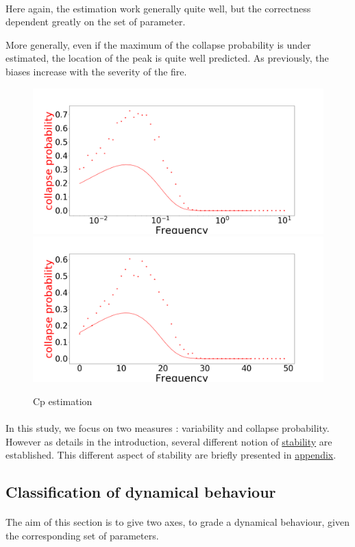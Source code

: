 \documentclass{article}
\begin{document}
\paragraph{}
Here again, the estimation work generally quite well, but the correctness dependent greatly on the set of parameter.

More generally, even if the maximum of the collapse probability is under estimated, the location of the peak is quite well predicted. As previously, the biases increase with the severity of the fire.


\begin{figure}[h!]
\centering
\includegraphics[width=6.cm]{cp_good.png}
\includegraphics[width=6.cm]{cp_bad.png}
\caption{Cp estimation}
\end{figure}



\paragraph{}
In this study, we focus on two measures : variability and collapse probability. However as details in the introduction, several different notion of \hyperref[stability_litterature]{stability} are established. This different aspect of stability are briefly presented in  \hyperref[stability_others]{appendix}.




\subsection{Classification of dynamical behaviour}

\label{axes_definition}

\paragraph{}
The aim of this section is to give two axes, to grade a dynamical behaviour, given the corresponding set of parameters.
\end{document}
